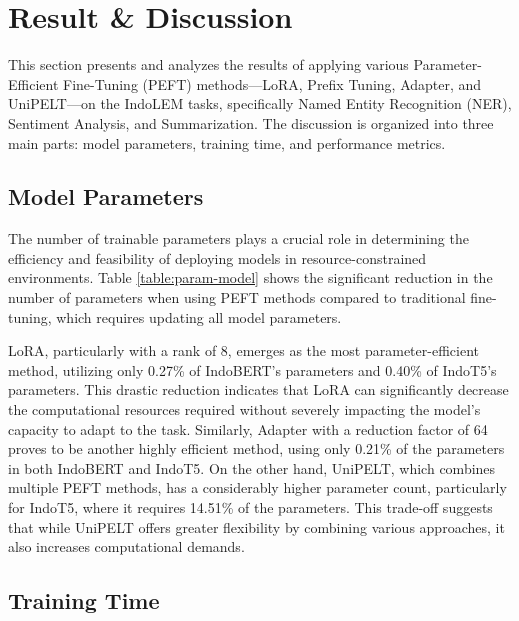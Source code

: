\section{Result \& Discussion}

This section presents and analyzes the results of applying various Parameter-Efficient Fine-Tuning (PEFT) methods—LoRA, Prefix Tuning, Adapter, and UniPELT—on the IndoLEM tasks, specifically Named Entity Recognition (NER), Sentiment Analysis, and Summarization. The discussion is organized into three main parts: model parameters, training time, and performance metrics.

\subsection{Model Parameters}

The number of trainable parameters plays a crucial role in determining the efficiency and feasibility of deploying models in resource-constrained environments. Table \ref{table:param-model} shows the significant reduction in the number of parameters when using PEFT methods compared to traditional fine-tuning, which requires updating all model parameters.

LoRA, particularly with a rank of 8, emerges as the most parameter-efficient method, utilizing only 0.27\% of IndoBERT's parameters and 0.40\% of IndoT5's parameters. This drastic reduction indicates that LoRA can significantly decrease the computational resources required without severely impacting the model's capacity to adapt to the task. Similarly, Adapter with a reduction factor of 64 proves to be another highly efficient method, using only 0.21\% of the parameters in both IndoBERT and IndoT5. On the other hand, UniPELT, which combines multiple PEFT methods, has a considerably higher parameter count, particularly for IndoT5, where it requires 14.51\% of the parameters. This trade-off suggests that while UniPELT offers greater flexibility by combining various approaches, it also increases computational demands.

\subsection{Training Time}

